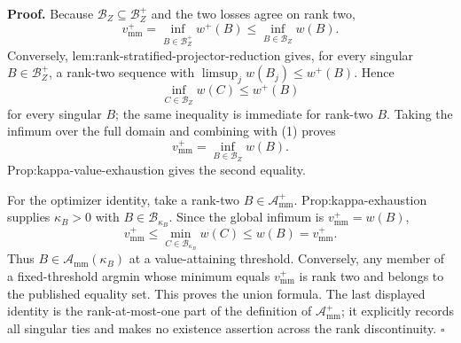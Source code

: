 \textbf{Proof.}
Because \(\mathcal B_Z\subseteq\mathcal B_Z^+\) and the two losses agree on rank two,
\[
 v_{\mathrm{mm}}^+
 =\inf_{B\in\mathcal B_Z^+}w^+(B)
 \le\inf_{B\in\mathcal B_Z}w(B).
 \tag{1}
\]
Conversely, lem:rank-stratified-projector-reduction gives, for every singular \(B\in\mathcal B_Z^+\), a rank-two sequence with \(\limsup_jw(B_j)\le w^+(B)\).  Hence
\[
 \inf_{C\in\mathcal B_Z}w(C)\le w^+(B)
\]
for every singular \(B\); the same inequality is immediate for rank-two \(B\).  Taking the infimum over the full domain and combining with (1) proves
\[
 v_{\mathrm{mm}}^+=\inf_{B\in\mathcal B_Z}w(B).
\]
Prop:kappa-value-exhaustion gives the second equality.

For the optimizer identity, take a rank-two \(B\in\mathcal A_{\mathrm{mm}}^+\).  Prop:kappa-exhaustion supplies \(\kappa_B>0\) with \(B\in\mathcal B_{\kappa_B}\).  Since the global infimum is \(v_{\mathrm{mm}}^+=w(B)\),
\[
 v_{\mathrm{mm}}^+
 \le\min_{C\in\mathcal B_{\kappa_B}}w(C)
 \le w(B)=v_{\mathrm{mm}}^+.
\]
Thus \(B\in\mathcal A_{\mathrm{mm}}(\kappa_B)\) at a value-attaining threshold.  Conversely, any member of a fixed-threshold argmin whose minimum equals \(v_{\mathrm{mm}}^+\) is rank two and belongs to the published equality set.  This proves the union formula.  The last displayed identity is the rank-at-most-one part of the definition of \(\mathcal A_{\mathrm{mm}}^+\); it explicitly records all singular ties and makes no existence assertion across the rank discontinuity. \(\square\)